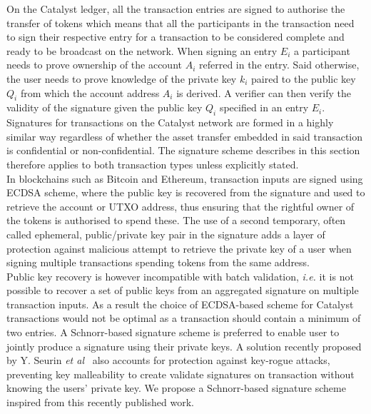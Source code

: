 On the Catalyst ledger, all the transaction entries are signed to authorise the transfer of tokens which means that all the participants in the transaction need to sign their respective entry for a transaction to be considered complete and ready to be broadcast on the network. When signing an entry $E_i$ a participant needs to prove ownership of the account $A_i$ referred in the entry. Said otherwise, the user needs to prove knowledge of the private key $k_i$ paired to the public key $Q_i$ from which the account address $A_i$ is derived. A verifier can then verify the validity of the signature given the public key $Q_i$ specified in an entry $E_i$.\\

Signatures for transactions on the Catalyst network are formed in a highly similar way regardless of whether the asset transfer embedded in said transaction is confidential or non-confidential. The signature scheme describes in this section therefore applies to both transaction types unless explicitly stated. \\

In blockchains such as Bitcoin and Ethereum, transaction inputs are signed using ECDSA scheme, where the public key is recovered from the signature and used to retrieve the account or UTXO address, thus ensuring that the rightful owner of the tokens is authorised to spend these. The use of a second temporary, often called ephemeral, public/private key pair in the signature adds a layer of protection against malicious attempt to retrieve the private key of a user when signing multiple transactions spending tokens from the same address.\\
 
 Public key recovery is however incompatible with batch validation, \textit{i.e.} it is not possible to recover a set of public keys from an aggregated signature on multiple transaction inputs. As a result the choice of ECDSA-based scheme for Catalyst transactions would not be optimal as a transaction should contain a minimum of two entries. A Schnorr-based signature scheme is preferred to enable user to jointly produce a signature using their private keys. A solution recently proposed by Y. Seurin \textit{et al}~\cite{schnorr} also accounts for protection against key-rogue attacks, preventing key malleability to create validate signatures on transaction without knowing the users' private key. We propose a Schnorr-based signature scheme inspired from this recently published work. \\

